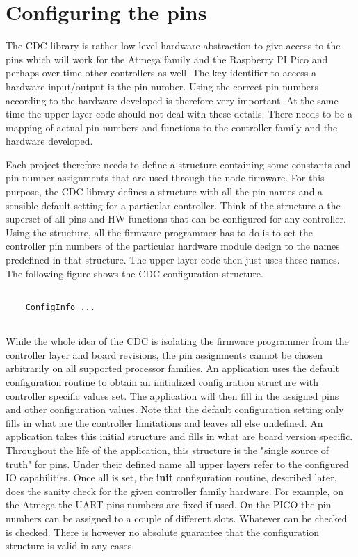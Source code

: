 \section{Configuring the pins}

The CDC library is rather low level hardware abstraction to give access to the pins which will work for the Atmega family and the Raspberry PI Pico and perhaps over time other controllers as well. The key identifier to access a hardware input/output is the pin number. Using the correct pin numbers according to the hardware developed is therefore very important. At the same time the upper layer code should not deal with these details. There needs to be a mapping of actual pin numbers and functions to the controller family and the hardware developed.

Each project therefore needs to define a structure containing some constants and pin number assignments that are used through the node firmware. For this purpose, the CDC library defines a structure with all the pin names and a sensible default setting for a particular controller. Think of the structure a the superset of all pins and HW functions that can be configured for any controller. Using the structure, all the firmware programmer has to do is to set the controller pin numbers of the particular hardware module design to the names predefined in that structure. The upper layer code then just uses these names. The following figure shows the CDC configuration structure.

\lstset{language=c++, style=codesnippetstyle}
\begin{lstlisting}
   
    ConfigInfo ...
    
\end{lstlisting}


While the whole idea of the CDC is isolating the firmware programmer from the controller layer and board revisions, the pin assignments cannot be chosen arbitrarily on all supported processor families. An application uses the default configuration routine to obtain an initialized configuration structure with controller specific values set. The application will then fill in the assigned pins and other configuration values. Note that the default configuration setting only fills in what are the controller limitations and leaves all else undefined. An application takes this initial structure and fills in what are board version specific. Throughout the life of the application, this structure is the "single source of truth" for pins. Under their defined name all upper layers refer to the configured IO capabilities. Once all is set, the \textbf{init} configuration routine, described later, does the sanity check for the given controller family hardware. For example, on the Atmega the UART pins numbers are fixed if used. On the PICO the pin numbers can be assigned to a couple of different slots. Whatever can be checked is checked. There is however no absolute guarantee that the configuration structure is valid in any cases.

